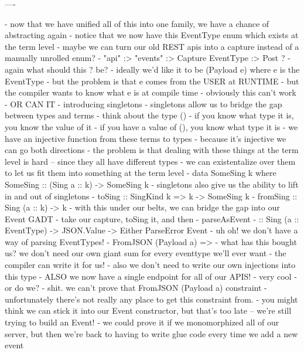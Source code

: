 
----


- now that we have unified all of this into one family, we have a chance of abstracting again
  - notice that we now have this EventType enum which exists at the term level
  - maybe we can turn our old REST apis into a capture instead of a manually unrolled enum?
  - "api" :> "events" :> Capture EventType :> Post ?
    - again what should this ? be?
    - ideally we'd like it to be (Payload e) where e is the EventType
    - but the problem is that e comes from the USER at RUNTIME
    - but the compiler wants to know what e is at compile time
  - obviously this can't work
- OR CAN IT
  - introducing singletons
  - singletons allow us to bridge the gap between types and terms
  - think about the type ()
    - if you know what type it is, you know the value of it
    - if you have a value of (), you know what type it is
    - we have an injective function from these terms to types
      - because it's injective we can go both directions
  - the problem is that dealing with these things at the term level is hard -- since they all have different types
    - we can existentalize over them to let us fit them into something at the term level
    - data SomeSing k where SomeSing :: (Sing a :: k) -> SomeSing k
  - singletons also give us the ability to lift in and out of singletons
    - toSing :: SingKind k => k -> SomeSing k
    - fromSing :: Sing (a :: k) -> k
- with this under our belts, we can bridge the gap into our Event GADT
  - take our capture, toSing it, and then
  - parseAsEvent
    - :: Sing (a :: EventType) -> JSON.Value -> Either ParseError Event
  - uh oh! we don't have a way of parsing EventTypes!
    - FromJSON (Payload a) =>
- what has this bought us? we don't need our own giant sum for every eventtype we'll ever want
  - the compiler can write it for us!
  - also we don't need to write our own injections into this type
  - ALSO we now have a single endpoint for all of our APIS!
    - very cool
- or do we?
  - shit. we can't prove that FromJSON (Payload a) constraint
- unfortunately there's not really any place to get this constraint from.
  - you might think we can stick it into our Event constructor, but that's too late -- we're still trying to build an Event!
  - we could prove it if we monomorphized all of our server, but then we're back to having to write glue code every time we add a new event
